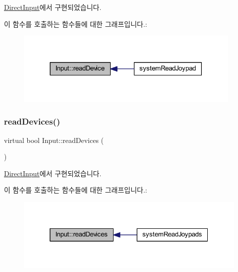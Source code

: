 \mbox{\hyperlink{class_direct_input_af7d74c03d302905eaa06e88ab37b7dac}{Direct\+Input}}에서 구현되었습니다.

이 함수를 호출하는 함수들에 대한 그래프입니다.\+:
\nopagebreak
\begin{figure}[H]
\begin{center}
\leavevmode
\includegraphics[width=309pt]{class_input_a57a47977bda8fcf6de237401b4c2e0dd_icgraph}
\end{center}
\end{figure}
\mbox{\label{class_input_a422dbf7bc783378d47eddec93d1f565a}} 
\subsubsection{\texorpdfstring{read\+Devices()}{readDevices()}}
{\footnotesize\ttfamily virtual bool Input\+::read\+Devices (\begin{DoxyParamCaption}{ }\end{DoxyParamCaption})\hspace{0.3cm}{\ttfamily [pure virtual]}}



\mbox{\hyperlink{class_direct_input_a53a2984e75989b381fdae4c8c33f5c32}{Direct\+Input}}에서 구현되었습니다.

이 함수를 호출하는 함수들에 대한 그래프입니다.\+:
\nopagebreak
\begin{figure}[H]
\begin{center}
\leavevmode
\includegraphics[width=319pt]{class_input_a422dbf7bc783378d47eddec93d1f565a_icgraph}
\end{center}
\end{figure}
\mbox{\label{class_input_a90c42a9d91bf671aaee3d5f611199eec}} 
